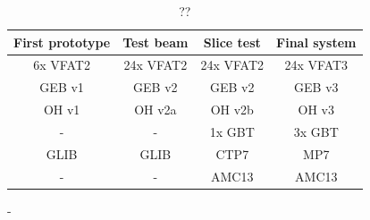     \begin{table}
      \begin{tabularx}{\textwidth}{C{1}C{1}C{1}C{1}}
        \textbf{First prototype} & \textbf{Test beam}   & \textbf{Slice test}  & \textbf{Final system} \\ \hline
        6x VFAT2        & 24x VFAT2   & 24x VFAT2   & 24x VFAT3 \\
        GEB v1          & GEB v2      & GEB v2      & GEB v3 \\
        OH v1           & OH v2a      & OH v2b      & OH v3 \\
        -               & -           & 1x GBT      & 3x GBT \\
        GLIB            & GLIB        & CTP7        & MP7 \\
        -               & -           & AMC13       & AMC13 \\
      \end{tabularx}
      \caption{??}
    \end{table}
































-
